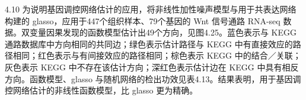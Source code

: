 \begin{bookexample}{4.10}
为说明基因调控网络估计的应用，将非线性加性噪声模型与用于共表达网络构建的 glasso，应用于447个组织样本、79个基因的 Wnt 信号通路 RNA-seq 数据。双变量因果发现的函数模型估计出49个方向，见图4.25。蓝色表示与 KEGG 通路数据库中方向相同的共同边；绿色表示估计路径与 KEGG 中有直接效应的路径相同；红色表示与有间接效应的路径相同；棕色表示 KEGG 中的结合／关联；灰色表示 KEGG 中不存在该估计方向；深红色表示估计边在 KEGG 中具有相反方向。函数模型、glasso 与随机网络的检出功效见表4.13。结果表明，用于基因调控网络估计的非线性函数模型，比 glasso 更为精确。
\end{bookexample}


\FloatBarrier
